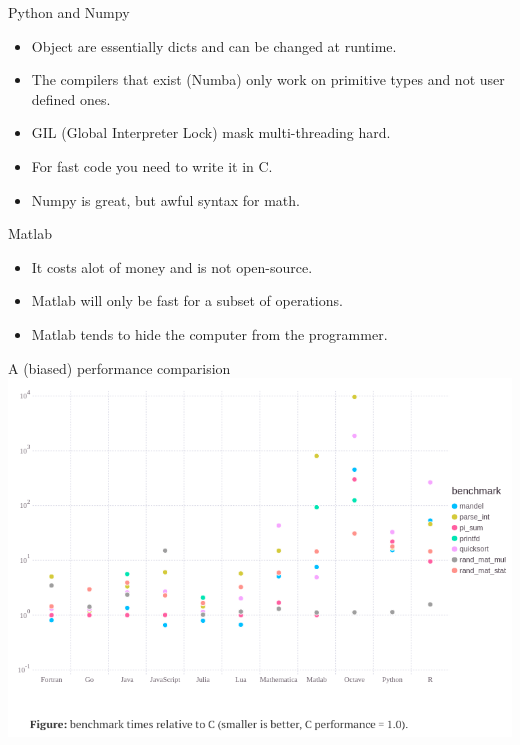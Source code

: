 \documentclass{beamer}
\begin{document}
\begin{frame}{Python and Numpy}
  \begin{itemize}
    \item Object are essentially dicts and can be changed at runtime.
    \item The compilers that exist (Numba) only work on primitive types and not user defined ones.
    \item GIL (Global Interpreter Lock) mask multi-threading hard.
    \item For fast code you need to write it in C.
    \item Numpy is great, but awful syntax for math.
  \end{itemize}
\end{frame}

\begin{frame}{Matlab}
  \begin{itemize}
    \item It costs alot of money and is not open-source.
    \item Matlab will only be fast for a subset of operations.
    \item Matlab tends to hide the computer from the programmer.
  \end{itemize}
\end{frame}

\begin{frame}{A (biased) performance comparision}
  \center
  \includegraphics[width=\linewidth]{benchmarks}
\end{frame}
\end{document}

